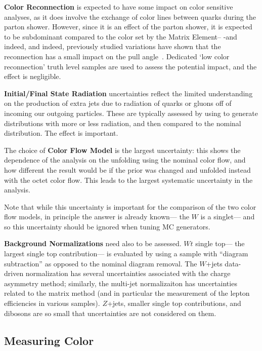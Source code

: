 \textbf{Color Reconnection} is expected to have some impact on color sensitive analyses, as it does involve the exchange of color lines between quarks during the parton shower. However, since it is an effect of the parton shower, it is expected to be subdominant compared to the color set by the Matrix Element-- -and indeed, and indeed, previously studied variations have shown that the reconnection has a small impact on the pull angle~\cite{Altheimer:2013yza}.  Dedicated `low color reconnection' truth level samples are used to assess the potential impact, and the effect is negligible.


	\textbf{Initial/Final State Radiation} uncertainties reflect the limited understanding on the production of extra jets due to radiation of quarks or gluons off of incoming our outgoing particles. These are typically assessed by using \Acermc to generate distributions with more or less radiation, and then compared to the nominal distribution. The effect is important.

	The choice of \textbf{Color Flow Model} is the largest uncertainty: this shows the dependence of the analysis on the unfolding using the nominal color flow, and how different the result would be if the prior was changed and unfolded instead with the octet color flow. This leads to the largest systematic uncertainty in the analysis.

	Note that while this uncertainty is important for the comparison of the two color flow models, in principle the answer is already known--- the $W$ is a singlet--- and so this uncertainty should be ignored when tuning MC generators.

	\textbf{Background Normalizations} need also to be assessed. $Wt$ single top--- the largest single top contribution--- is evaluated by using a sample with ``diagram subtraction'' as opposed to the nominal diagram removal. The $W$+jets data-driven normalization has several uncertainties associated with the charge asymmetry method; similarly, the multi-jet normalizaiton has uncertainties related to the matrix method (and in particular the measurement of the lepton efficiencies in various samples). $Z$+jets, smaller single top contributions, and dibosons are so small that uncertainties are not considered on them. 


\subsection{Measuring Color}
\label{color:measuringcolor}

